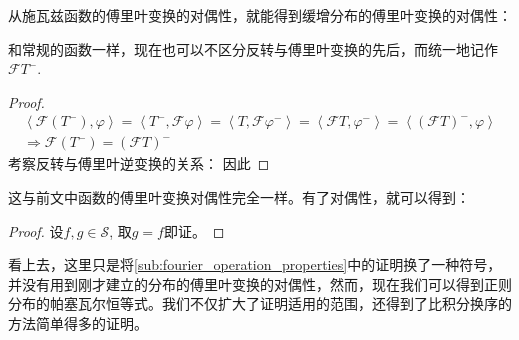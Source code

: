 从施瓦兹函数的傅里叶变换的对偶性，就能得到缓增分布的傅里叶变换的对偶性：
\begin{theorem}[分布傅里叶变换的对偶性]
    \quad
\end{theorem}
和常规的函数一样，现在也可以不区分反转与傅里叶变换的先后，而统一地记作$\mathcal{F} T^-$.
\begin{proof}
    \begin{align*}
    \left\langle\mathcal{F}(T^-),\varphi\right\rangle=\left\langle T^-,\mathcal{F}\varphi\right\rangle=\left\langle T,\mathcal{F} \varphi^-\right\rangle=\left\langle\mathcal{F}T,\varphi^-\right\rangle=\left\langle(\mathcal{F}T)^-,\varphi\right\rangle \\
    \Rightarrow\mathcal{F}(T^-)= (\mathcal{F}T)^-
\end{align*}
考察反转与傅里叶逆变换的关系：
因此
\end{proof}
这与前文中函数的傅里叶变换对偶性完全一样。有了对偶性，就可以得到：
\begin{theorem}
    \quad
\end{theorem}
\begin{proof}
设$f,g\in\mathcal{S} $,
取$g=f$即证。
\end{proof}
看上去，这里只是将\ref{sub:fourier_operation_properties}中的证明换了一种符号，并没有用到刚才建立的分布的傅里叶变换的对偶性，然而，现在我们可以得到正则分布的帕塞瓦尔恒等式。我们不仅扩大了证明适用的范围，还得到了比积分换序的方法简单得多的证明。

